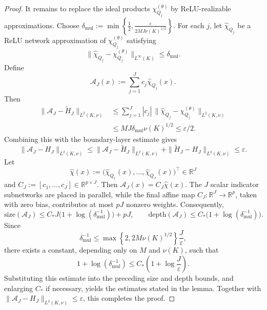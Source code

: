 \documentclass{article}
\numberwithin{equation}{section}
\theoremstyle{plain}
\begin{document}
\begin{proof}
		It remains to replace the ideal products $\chi^{(\theta)}_{Q_j}$ by
		ReLU-realizable approximations. Choose
		$
		\delta_{\mathrm{mul}}
		:=
		\min\left\{\frac12,\frac{\varepsilon}{2MJ\nu(K)^{1/2}}\right\}
		$.
		For each $j$, let $\widehat\chi_{Q_j}$ be a ReLU network approximation of $\chi^{(\theta)}_{Q_j}$ satisfying
		\begin{equation*}
			\|\widehat\chi_{Q_j}-\chi^{(\theta)}_{Q_j}\|_{L^\infty(K)}
			\le \delta_{\mathrm{mul}}.
		\end{equation*}
		Define
		\begin{equation*}
			\mathcal A_J(x)
			:=
			\sum_{j=1}^{J}c_j\widehat\chi_{Q_j}(x).
		\end{equation*}
		Then
		\begin{equation*}
		\begin{aligned}
			\|\mathcal A_J-\widetilde H_J\|_{L^2(K,\nu)}
			&\le
			\sum_{j=1}^{J}|c_j|\,
			\|\widehat\chi_{Q_j}-\chi^{(\theta)}_{Q_j}\|_{L^2(K,\nu)}  \\
			&\le
			M J\delta_{\mathrm{mul}}\nu(K)^{1/2}
			\le \varepsilon/2.
		\end{aligned}
		\end{equation*}
		Combining this with the boundary-layer estimate gives
		\begin{equation*}
			\|\mathcal A_J-H_J\|_{L^2(K,\nu)}
			\le
			\|\mathcal A_J-\widetilde H_J\|_{L^2(K,\nu)}
			+
			\|\widetilde H_J-H_J\|_{L^2(K,\nu)}
			\le \varepsilon.
		\end{equation*}
		Let
		\begin{equation*}
			\widehat\chi(x)
			:=
			\bigl(\widehat\chi_{Q_1}(x),\ldots,\widehat\chi_{Q_J}(x)\bigr)^{\top}
			\in\mathbb R^J
		\end{equation*}
		and $C_J:=[c_1,\ldots,c_J]\in\mathbb R^{p\times J}$. Then $\mathcal A_J(x)=C_J\widehat\chi(x)$. The $J$ scalar indicator subnetworks are placed in parallel, while the final affine map $C_J:\mathbb R^J\to\mathbb R^p$, taken with zero bias, contributes at most $pJ$ nonzero weights. Consequently,
		\begin{equation*}
			\mathrm{size}(\mathcal A_J)
			\le
			C_*J\bigl(1+\log(\delta_{\mathrm{mul}}^{-1})\bigr)+pJ,
			\qquad
			\mathrm{depth}(\mathcal A_J)
			\le
			C_*\bigl(1+\log(\delta_{\mathrm{mul}}^{-1})\bigr).
		\end{equation*}
		Since
		\begin{equation*}
			\delta_{\mathrm{mul}}^{-1}
			\le
			\max\left\{2,2M\nu(K)^{1/2}\right\}\frac{J}{\varepsilon},
		\end{equation*}
		there exists a constant, depending only on $M$ and $\nu(K)$, such that
		\begin{equation*}
			1+\log(\delta_{\mathrm{mul}}^{-1})
			\le
			C_*\left(1+\log\frac{J}{\varepsilon}\right).
		\end{equation*}
		Substituting this estimate into the preceding size and depth
		bounds, and enlarging $C_*$ if necessary, yields the estimates
		stated in the lemma. Together with
		$\|\mathcal A_J-H_J\|_{L^2(K,\nu)}\le\varepsilon$, this completes
		the proof.
	\end{proof}
	
\end{document}
